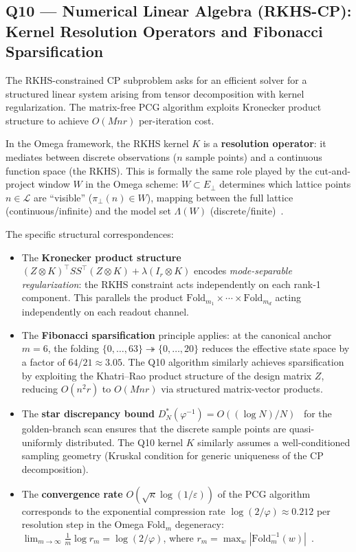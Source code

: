 \subsection{Q10 --- Numerical Linear Algebra (RKHS-CP):
  Kernel Resolution Operators and Fibonacci Sparsification}
\label{ss:omega-q10}

\begin{remark}
The RKHS-constrained CP subproblem asks for an efficient solver
for a structured linear system arising from tensor decomposition
with kernel regularization.  The matrix-free PCG algorithm exploits
Kronecker product structure to achieve $O(Mnr)$ per-iteration cost.

In the Omega framework, the RKHS kernel $K$ is a
\textbf{resolution operator}: it mediates between discrete
observations ($n$ sample points) and a continuous function space
(the RKHS).  This is formally the same role played by the
cut-and-project window $W$ in the Omega scheme:
$W\subset E_\perp$ determines which lattice points
$n\in\mathcal L$ are ``visible'' ($\pi_\perp(n)\in W$),
mapping between the full lattice (continuous/infinite) and the
model set $\Lambda(W)$ (discrete/finite)~\cite{omega-grg}.

The specific structural correspondences:
\begin{itemize}[nosep]
\item The \textbf{Kronecker product structure}
  $(Z\otimes K)^\top SS^\top(Z\otimes K)+\lambda(I_r\otimes K)$
  encodes \emph{mode-separable regularization}: the RKHS constraint
  acts independently on each rank-1 component.
  This parallels the product $\mathrm{Fold}_{m_1}\times\cdots\times\mathrm{Fold}_{m_d}$
  acting independently on each readout channel.
\item The \textbf{Fibonacci sparsification} principle applies:
  at the canonical anchor $m=6$, the folding
  $\{0,\dots,63\}\twoheadrightarrow\{0,\dots,20\}$
  reduces the effective state space by a factor of $64/21\approx 3.05$.
  The Q10 algorithm similarly achieves sparsification by exploiting
  the Khatri--Rao product structure of the design matrix $Z$,
  reducing $O(n^2r)$ to $O(Mnr)$ via structured matrix-vector products.
\item The \textbf{star discrepancy bound}
  $D_N^*(\varphi^{-1})=O((\log N)/N)$~\cite{omega-grg}
  for the golden-branch scan ensures that the discrete sample points
  are quasi-uniformly distributed.  The Q10 kernel $K$ similarly
  assumes a well-conditioned sampling geometry (Kruskal condition
  for generic uniqueness of the CP decomposition).
\item The \textbf{convergence rate} $O(\sqrt\kappa\log(1/\varepsilon))$
  of the PCG algorithm corresponds to the exponential compression
  rate $\log(2/\varphi)\approx 0.212$ per resolution step in the
  Omega Fold$_m$ degeneracy:
  $\lim_{m\to\infty}\frac{1}{m}\log r_m=\log(2/\varphi)$,
  where $r_m=\max_w|\mathrm{Fold}_m^{-1}(w)|$~\cite{omega-fop}.
\end{itemize}


\end{remark}
